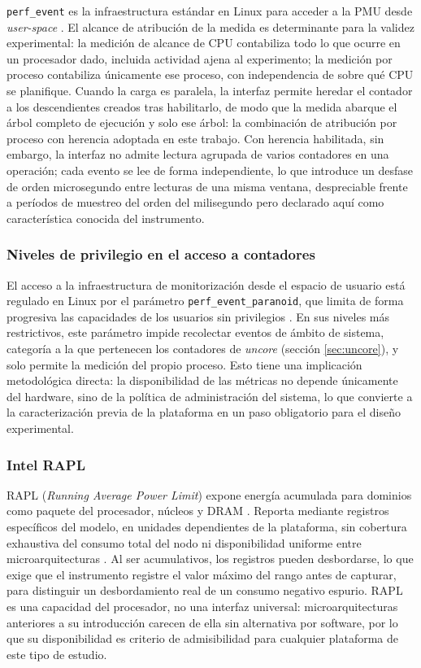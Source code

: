 \documentclass[12pt,oneside,spanish]{book}
\begin{document}
\texttt{perf\_event} es la infraestructura estándar en Linux para acceder a la PMU desde \textit{user-space} \cite{Weaver2015}. El alcance de atribución de la medida es determinante para la validez experimental: la medición de alcance de CPU contabiliza todo lo que ocurre en un procesador dado, incluida actividad ajena al experimento; la medición por proceso contabiliza únicamente ese proceso, con independencia de sobre qué CPU se planifique. Cuando la carga es paralela, la interfaz permite heredar el contador a los descendientes creados tras habilitarlo, de modo que la medida abarque el árbol completo de ejecución y solo ese árbol: la combinación de atribución por proceso con herencia adoptada en este trabajo. Con herencia habilitada, sin embargo, la interfaz no admite lectura agrupada de varios contadores en una operación; cada evento se lee de forma independiente, lo que introduce un desfase de orden microsegundo entre lecturas de una misma ventana, despreciable frente a períodos de muestreo del orden del milisegundo pero declarado aquí como característica conocida del instrumento.

\subsubsection{Niveles de privilegio en el acceso a contadores}
\label{sec:paranoid}

El acceso a la infraestructura de monitorización desde el espacio de usuario está regulado en Linux por el parámetro \texttt{perf\_event\_paranoid}, que limita de forma progresiva las capacidades de los usuarios sin privilegios \cite{LinuxPerfEventOpen2026}. En sus niveles más restrictivos, este parámetro impide recolectar eventos de ámbito de sistema, categoría a la que pertenecen los contadores de \textit{uncore} (sección \ref{sec:uncore}), y solo permite la medición del propio proceso. Esto tiene una implicación metodológica directa: la disponibilidad de las métricas no depende únicamente del hardware, sino de la política de administración del sistema, lo que convierte a la caracterización previa de la plataforma en un paso obligatorio para el diseño experimental.

\subsubsection{Intel RAPL}

RAPL (\textit{Running Average Power Limit}) expone energía acumulada para dominios como paquete del procesador, núcleos y DRAM \cite{David2010,Thamm2025}. Reporta mediante registros específicos del modelo, en unidades dependientes de la plataforma, sin cobertura exhaustiva del consumo total del nodo ni disponibilidad uniforme entre microarquitecturas \cite{Thamm2025}. Al ser acumulativos, los registros pueden desbordarse, lo que exige que el instrumento registre el valor máximo del rango antes de capturar, para distinguir un desbordamiento real de un consumo negativo espurio. RAPL es una capacidad del procesador, no una interfaz universal: microarquitecturas anteriores a su introducción carecen de ella sin alternativa por software, por lo que su disponibilidad es criterio de admisibilidad para cualquier plataforma de este tipo de estudio.
\end{document}
